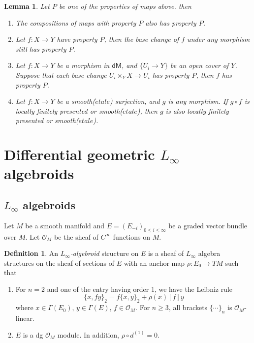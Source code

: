 \documentclass[12pt]{amsart}
\newtheorem{lem}[thm]{Lemma}
\theoremstyle{definition}
\newtheorem{defn}[thm]{Definition}
\theoremstyle{remark}
\numberwithin{equation}{section}
\newcommand{\CO}{{\mathcal O}}
\newcommand{\1}{{\mathbb{1}}}
\newcommand{\dm}{\mathsf{dM}}
\begin{document}
\begin{lem} \label{lem: maps}
Let $P$ be one of the properties of maps above. then
	\begin{enumerate}
		\item The compositions of maps with property $P$ also has property $P$.
		\item Let  $f:X\to Y$ have property $P$, then the base change of $f$ under any morphism still has property $P$.
		\item Let $f:X\to Y$ be a morphism in $\dm$, and $\{U_i\to Y\}$ be an open cover of $Y$. Suppose that each base change $U_i\times_Y X\to U_i$ has property $P$, then $f$ has property $P$.
		\item Let $f:X\to Y$ be a smooth($\acute{e}tale $) surjection, and $g$ is any morphism. If $g\circ f$ is locally finitely presented or smooth($\acute{e}tale$), then $g$ is also locally finitely presented or smooth($\acute{e}tale$). 
	\end{enumerate}	
\end{lem}

    

\section{Differential geometric $L_{\infty}$ algebroids}
\subsection{$L_{\infty}$ algebroids}
Let $M$ be a smooth manifold and $E=(E_{-i})_{0\le i\le \infty}$ be a graded vector bundle over $M$. Let $\CO_M$ be the sheaf of $C^{\infty}$ functions on $M$. 
\begin{defn}
    An {\it $L_{\infty}$-algebroid} structure on $E$ is a sheaf of $L_{\infty}$ algebra structures on the sheaf of sections of $E$ with an anchor map $\rho: E_{0} \to TM$ such that
\begin{enumerate}
	\item For $n=2$ and one of the entry having order 1, we have the Leibniz rule
	\begin{equation*}
	\{x, fy \}_2=f\{x,y \}_2+\rho(x)[f]y
	\end{equation*}
	where $x\in \Gamma(E_0)$, $y\in \Gamma(E)$, $f\in \CO_M$. For $n\ge 3$, all brackets $\{\cdots \}_n$ is $\CO_M$-linear. 
	\item $E$ is a dg $\CO_M$ module. In addition, $\rho\circ d^{(1)}=0$. 
\end{enumerate} 
\end{defn}
\end{document}
